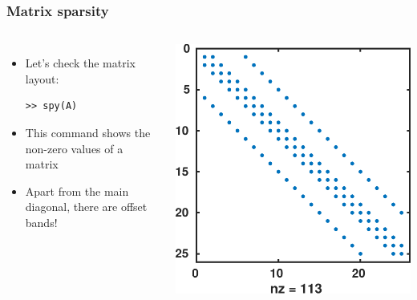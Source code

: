 \documentclass[11pt,table,final,xcolor={usenames,dvipsnames,table}]{beamer}
\begin{document}
\begin{frame}[fragile]
  \frametitle{Matrix sparsity}
  \begin{columns}
  
  \begin{itemize}
   \item Let's check the matrix layout:
   \begin{lstlisting}
>> spy(A)
   \end{lstlisting}
    \item This command shows the non-zero values of a matrix
    \item Apart from the main diagonal, there are offset bands!
  \end{itemize}
    \includegraphics[width=\columnwidth]{img/sparse_matlab}
  \end{columns}
\end{frame}
\end{document}
